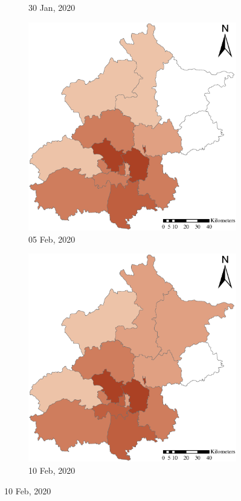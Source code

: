 \documentclass[preprints,ijgi,submit,moreauthors]{Definitions/mdpi}
\begin{document}
\begin{figure}[ht]
\begin{subfigure}{.23\textwidth}
        \caption{30 Jan, 2020}
    \end{subfigure}
    \begin{subfigure}{.23\textwidth}
        \includegraphics[width=\textwidth]{Figures/ConfirmedDistrictD2020_02_05.eps}
        \caption{05 Feb, 2020}
    \end{subfigure}
    \begin{subfigure}{.23\textwidth}
        \includegraphics[width=\textwidth]{Figures/ConfirmedDistrictD2020_02_10.eps}
        \caption{10 Feb, 2020}
    \end{subfigure}


\end{figure}
\end{document}
